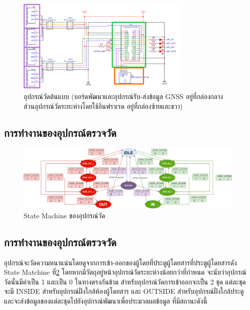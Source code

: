 \begin{figure}[h!]
  \begin{center}
    \includegraphics[width=0.75\textwidth]{schematic-framed.png}
  \end{center}
  \caption[อุปกรณ์วัดต้นแบบ]{อุปกรณ์วัดต้นแบบ (บอร์ดพัฒนาและอุปกรณ์รับ-ส่งข้อมูล GNSS อยู่ที่กล่องกลาง ส่วนอุปกรณ์วัดระยะห่างโดยใช้อินฟราเรด อยู่ที่กล่องซ้ายและขวา)}
  \label{fig:schematic-framed}
\end{figure}

\subsection{การทํางานของอุปกรณ์ตรวจวัด}

\begin{figure}[h!]
  \begin{center}
    \includegraphics[width=1\textwidth]{state-machine.png}
  \end{center}
  \caption{State Machine ของอุปกรณ์วัด}
  \label{fig:state-machine}
\end{figure}


\subsection{การทํางานของอุปกรณ์ตรวจวัด}

อุปกรณ์จะวัดความหนาแน่นโดยดูจากการเข้า-ออกของผู้โดยที่ประตูผู้โดยสารที่ประตูผู้โดยสารดัง State Matchine ที่\ref{fig:state-machine} โดยหากมีวัตถุอยู่หน้าอุปกรณ์วัดระยะห่างน้อยกว่าที่กำหนด จะนับว่าอุปกรณ์วัดนั้นมีค่าเป็น 1 และเป็น 0 ในทางตรงกันข้าม สำหรับอุปกรณ์วัดการเข้าออกจะเป็น 2 ชุด แต่ละชุดจะมี INSIDE สำหรับอุปกรณ์ฝั่งใกล้ห้องผู้โดยสาร และ OUTSIDE สำหรับอุปกรณ์ฝั่งใกล้ประตู และจะส่งข้อมูลของแต่ละชุดไปยังอุปกรณ์พัฒนาเพื่อประมวลผลข้อมูล ที่มีสถานะดังนี้

